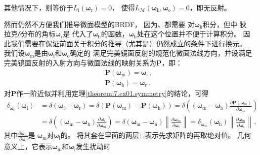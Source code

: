 其他情况下，则等价于$L_{\mathrm{i}}({\bm\omega}_{\mathrm{r}})=0$，
使得$L_{\mathcal{M}}({\bm\omega}_{\mathrm{h}},{\bm\omega}_{\mathrm{o}})=0$，即无反射。

然而仍然不方便我们推导微面模型的BRDF，
因为、都需要
对${\bm\omega}_{\mathrm{h}}$积分，但中
狄拉克$\delta$分布的角标${\bm\omega}_{\mathrm{r}}$是
代入了${\bm\omega}_{\mathrm{h}}$的函数，${\bm\omega}_{\mathrm{h}}$处在这个位置并不便于计算积分。
因此我们需要在保证前面关于积分的推导（尤其是）仍然成立的条件下进行换元。
我们设${\bm\omega}_{\mathrm{m}}$是由${\bm\omega}_{\mathrm{i}}$和${\bm\omega}_{\mathrm{o}}$确定的
满足完美镜面反射的规范化微面法线方向，并设满足完美镜面反射的入射方向与微面法线的映射关系为$\bm P$，即：
\begin{align}
    {\bm P}({\bm\omega}_{\mathrm{m}})={\bm\omega}_{\mathrm{i}}\, , \\
    {\bm P}({\bm\omega}_{\mathrm{h}})={\bm\omega}_{\mathrm{r}}\, .
\end{align}
对$\bm P$作一阶近似并利用定理\ref{theorem:7.ex01.symmetry}的结论，可得
\begin{align}\label{eq:08ex01-DeltaChangeVar}
    \delta_{{\bm\omega}_{\mathrm{r}}}({\bm\omega}_{\mathrm{i}})
     & =\delta({\bm\omega}_{\mathrm{i}}-{\bm\omega}_{\mathrm{r}})
    =\delta({\bm P}({\bm\omega}_{\mathrm{m}})-{\bm P}({\bm\omega}_{\mathrm{h}}))
    =\displaystyle\delta\left(({\bm\omega}_{\mathrm{m}}-{\bm\omega}_{\mathrm{h}})
    \frac{\partial{\bm P}({\bm\omega}_{\mathrm{m}})}{\partial{\bm\omega}_{\mathrm{m}}}\right)\nonumber \\
     & =\displaystyle\delta\left(({\bm\omega}_{\mathrm{m}}-{\bm\omega}_{\mathrm{h}})
    \frac{\partial{\bm\omega}_{\mathrm{i}}}{\partial{\bm\omega}_{\mathrm{m}}}\right)
    =\delta({\bm\omega}_{\mathrm{m}}-{\bm\omega}_{\mathrm{h}})
    \left\lVert\frac{\partial{\bm\omega}_{\mathrm{m}}}{\partial{\bm\omega}_{\mathrm{i}}}\right\rVert
    =\delta_{{\bm\omega}_{\mathrm{m}}}({\bm\omega}_{\mathrm{h}})
    \left\lVert\frac{\partial{\bm\omega}_{\mathrm{m}}}{\partial{\bm\omega}_{\mathrm{i}}}\right\rVert\, .
\end{align}
其中$\displaystyle\frac{\partial{\bm\omega}_{\mathrm{m}}}{\partial{\bm\omega}_{\mathrm{i}}}$是
${\bm\omega}_{\mathrm{m}}$对${\bm\omega}_{\mathrm{i}}$的。
将其套在里面的两层$|\cdot|$表示先求矩阵的再取绝对值。
几何意义上，它表示${\bm\omega}_{\mathrm{m}}$和${\bm\omega}_{\mathrm{i}}$发生扰动时
